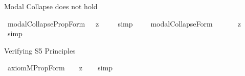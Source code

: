 \begin{isabellebody}
%
\endisatagproof
{\isafoldproof}%
%
\isadelimproof
%
\endisadelimproof
%
\begin{isamarkuptext}%
Modal Collapse does not hold%
\end{isamarkuptext}%
\isamarkuptrue%
\isamarkupfalse%
\ modalCollapse{\isacharunderscore}PropForm{\isacharcolon}\ {\isachardoublequoteopen}{\isasymforall}{\isasymphi}{\isachardot}\ {\isacharbrackleft}{\isacharcomma}{\isasymphi}{\isacharcomma}\ {\isasymrightarrow}\isactrlsup z\ {\isasymbox}\ {\isacharcomma}{\isasymphi}{\isacharcomma}{\isacharbrackright}{\isachardoublequoteclose}%
\isadelimproof
\ %
\endisadelimproof
%
\isatagproof
{}\isamarkupfalse%
\ {\isacharparenleft}simp{\isacharparenright}%
\endisatagproof
{\isafoldproof}%
%
\isadelimproof
%
\endisadelimproof
\ \isamarkupfalse%
%
\isadelimproof
\ %
\endisadelimproof
%
\isatagproof
{}\isamarkupfalse%
%
\endisatagproof
{\isafoldproof}%
%
\isadelimproof
%
\endisadelimproof
\isanewline
{}\isamarkupfalse%
\ modalCollapse{\isacharunderscore}Form{\isacharcolon}\ \ \ \ \ {\isachardoublequoteopen}{\isasymforall}{\isasymphi}{\isachardot}\ {\isacharbrackleft}{\isacharsemicolon}{\isasymphi}{\isacharsemicolon}\ {\isasymrightarrow}\isactrlsup z\ {\isasymbox}\ {\isacharsemicolon}{\isasymphi}{\isacharsemicolon}{\isacharbrackright}{\isachardoublequoteclose}%
\isadelimproof
\ %
\endisadelimproof
%
\isatagproof
{}\isamarkupfalse%
\ {\isacharparenleft}simp{\isacharparenright}%
\endisatagproof
{\isafoldproof}%
%
\isadelimproof
%
\endisadelimproof
\ \isamarkupfalse%
%
\isadelimproof
\ %
\endisadelimproof
%
\isatagproof
{}\isamarkupfalse%
%
\endisatagproof
{\isafoldproof}%
%
\isadelimproof
%
\endisadelimproof
%
\begin{isamarkuptext}%
Verifying S5 Principles%
\end{isamarkuptext}%
\isamarkuptrue%
\isamarkupfalse%
\ axiom{\isacharunderscore}M{\isacharunderscore}PropForm{\isacharcolon}\ {\isachardoublequoteopen}{\isacharbrackleft}{\isasymforall}{\isacharparenleft}{\isasymlambda}{\isasymphi}{\isachardot}\ {\isacharparenleft}{\isasymbox}\ {\isacharcomma}{\isasymphi}{\isacharcomma}{\isacharparenright}\ {\isasymrightarrow}\isactrlsup z\ {\isacharcomma}{\isasymphi}{\isacharcomma}{\isacharparenright}{\isacharbrackright}{\isachardoublequoteclose}%
\isadelimproof
\ %
\endisadelimproof
%
\isatagproof
{}\isamarkupfalse%
\ {\isacharparenleft}simp{\isacharparenright}\ \isamarkupfalse%

\end{isabellebody}
